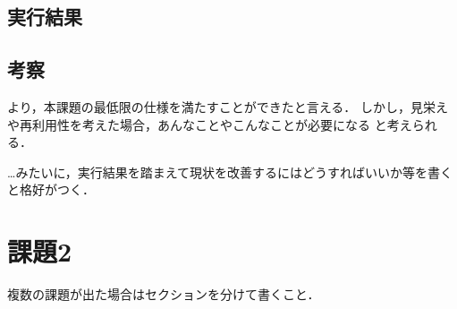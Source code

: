 \documentclass[a4j,10pt]{jsarticle}
\begin{document}
\subsection{実行結果}


\subsection{考察}

 より，本課題の最低限の仕様を満たすことができたと言える．
しかし，見栄えや再利用性を考えた場合，あんなことやこんなことが必要になる
と考えられる．

…みたいに，実行結果を踏まえて現状を改善するにはどうすればいいか等を書く
と格好がつく．

\section{課題2}

複数の課題が出た場合はセクションを分けて書くこと．
\end{document}
